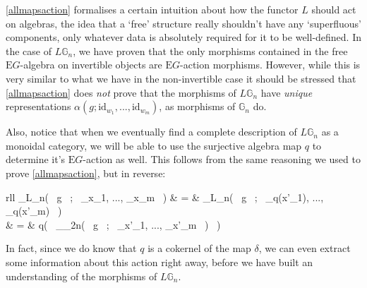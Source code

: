 \cref{allmapsaction} formalises a certain intuition about how the functor $L$ should act on algebras, the idea that a `free' structure really shouldn't have any `superfluous' components, only whatever data is absolutely required for it to be well-defined. In the case of $L\mathbb{G}_n$, we have proven that the only morphisms contained in the free $\mathrm{E}G$-algebra on invertible objects are $\mathrm{E}G$-action morphisms. However, while this is very similar to what we have in the non-invertible case it should be stressed that \cref{allmapsaction} does \emph{not} prove that the morphisms of $L\mathbb{G}_n$ have \emph{unique} representations $\alpha(g; \mathrm{id}_{w_1}, ..., \mathrm{id}_{w_m})$, as morphisms of $\mathbb{G}_n$ do.

Also, notice that when we eventually find a complete description of $L\mathbb{G}_n$ as a monoidal category, we will be able to use the surjective algebra map $q$ to determine it's $\mathrm{E}G$-action as well. This follows from the same reasoning we used to prove \cref{allmapsaction}, but in reverse:
\begin{eq*}\begin{array}{rll}
			\alpha_{L_n}( \, g \, ; \, _{x_1}, ..., _{x_m} \, ) & = & \alpha_{L_n}( \, g \, ; \, _{q(x'_1)}, ..., _{q(x'_m)} \, ) \\
			& = & q\big( \, \alpha_{_{2n}}( \, g \, ; \, _{x'_1}, ..., _{x'_m} \, ) \, \big)
		\end{array}
\end{eq*}
In fact, since we do know that $q$ is a cokernel of the map $\delta$, we can even extract some information about this action right away, before we have built an understanding of the morphisms of $L\mathbb{G}_n$.


